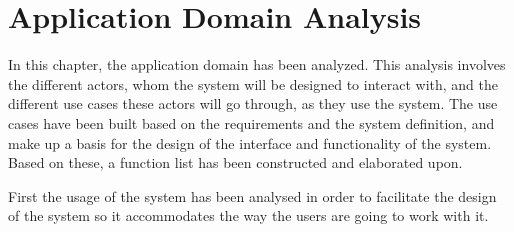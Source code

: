 \chapter{Application Domain Analysis} \label{ch:applicationdomain}
In this chapter, the application domain has been analyzed. This analysis involves the different actors, whom the system will be designed to interact with, and the different use cases these actors will go through, as they use the system. The use cases have been built based on the requirements and the system definition, and make up a basis for the design of the interface and functionality of the system. Based on these, a function list has been constructed and elaborated upon.
\par
First the usage of the system has been analysed in order to facilitate the design of the system so it accommodates the way the users are going to work with it. 